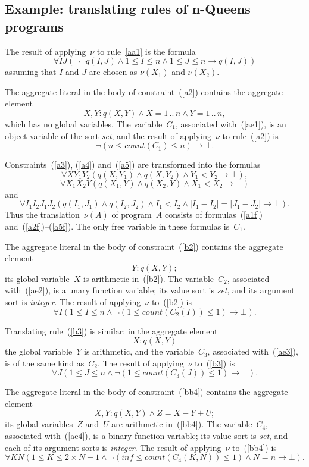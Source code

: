 \documentclass[11pt]{article}
\def\rar{\rightarrow}
\def\beq{\begin{equation}}
\def\eeq#1{\label{#1}\end{equation}}
\newcommand{\co}{\ensuremath{\mathit{count}}}
\begin{document}
\begin{adjustwidth}{-1cm}{-1cm}
\section{Example: translating rules of n-Queens programs}
\label{sec:examples-nu}

The result of applying~$\nu$ to rule~\eqref{aa1} is the formula
\beq
\forall I J (\neg\neg q(I,J) \land 1\leq I \leq n \land 1 \leq J \leq n \to q(I,J))
\eeq{a1f}
assuming that $I$ and $J$ are chosen as $\nu(X_1)$ and $\nu(X_2)$.

The aggregate literal in the body of constraint~(\ref{a2}) contains the
aggregate element
\beq
X,Y : q(X,Y) \land X = 1\,..\,n \land Y = 1\,..\,n,
\eeq{ae1}
which has no global variables.  The variable~$C_1$, associated
with~(\ref{ae1}), is an object variable of the sort \emph{set}, and the
result of applying~$\nu$ to rule~(\ref{a2}) is
\beq
\neg (n\leq \co(C_1)\leq n)\rar\bot.
\eeq{a2f}

Constraints~(\ref{a3}), (\ref{a4}) and~(\ref{a5}) are transformed into the
formulas
\beq
\forall XY_1Y_2(q(X,Y_1) \land q(X,Y_2) \land Y_1 < Y_2 \to \bot),
\eeq{a3f}
\beq
\forall X_1X_2Y(q(X_1,Y) \land q(X_2,Y) \land X_1 < X_2 \to \bot)
\eeq{a4f}
and
\beq
\forall I_1I_2J_1J_2
(q(I_1,J_1) \land q(I_2,J_2) \land I_1<I_2 \land |I_1-I_2|=|J_1-J_2| \to\bot).
\eeq{a5f}
Thus the translation~$\nu(A)$ of program~$A$ consists of
formulas~(\ref{a1f}) and~(\ref{a2f})--(\ref{a5f}).  The
only free variable in these formulas is~$C_1$.

The aggregate literal in the body of constraint~(\ref{b2}) contains the
aggregate element
\beq
Y : q(X,Y);
\eeq{ae2}
its global variable~$X$ is arithmetic in~(\ref{b2}).  The variable~$C_2$,
associated with~(\ref{ae2}), is a unary function variable; its value sort
is \emph{set}, and its argument sort is \emph{integer}.
The result of applying~$\nu$ to~(\ref{b2}) is
\beq
\forall I(1\leq I\leq n \land \neg (1\leq \co(C_2(I))\leq 1)\to \bot).
\eeq{b2f}

Translating rule~(\ref{b3}) is similar; in the aggregate element
\beq
X : q(X,Y)
\eeq{ae3}
the global variable~$Y$ is arithmetic, and the variable~$C_3$,
associated with~(\ref{ae3}), is of the same kind as~$C_2$.
The result of applying~$\nu$ to~(\ref{b3}) is
\beq
\forall J(1\leq J\leq n \land \neg (1\leq \co(C_3(J))\leq 1)\to \bot).
\eeq{b3f}

The aggregate literal in the body of constraint~(\ref{bb4}) contains the
aggregate element
\beq
 X,Y : q(X,Y) \land Z = X-Y+U;
\eeq{ae4}
its global variables~$Z$ and~$U$ are arithmetic in~(\ref{bb4}).
The variable~$C_4$,
associated with~(\ref{ae4}), is a binary function variable; its value sort
is \emph{set}, and each of its argument sorts is \emph{integer}.
The result of applying~$\nu$ to~(\ref{bb4}) is
\beq
\forall KN
(1\leq K\leq 2\times N-1
\land\neg(\mathit{inf}\leq\co(C_4(K,N))\leq 1)\land N=n\to\bot).
\eeq{b4f}


\end{adjustwidth}
\end{document}
